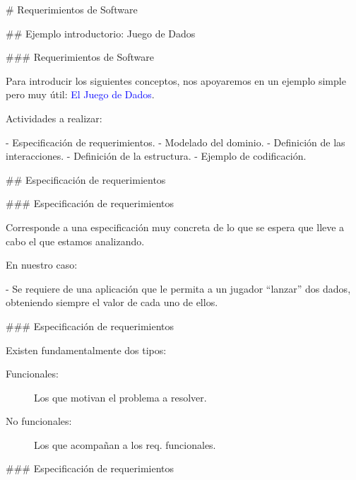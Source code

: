 # Requerimientos de Software

## Ejemplo introductorio: Juego de Dados

### Requerimientos de Software


Para introducir los siguientes conceptos, nos apoyaremos en un ejemplo simple pero muy útil:
\textcolor{blue}{El Juego de Dados}.\newline

Actividades a realizar:

- Especificación de requerimientos.
- Modelado del dominio.
- Definición de las interacciones.
- Definición de la estructura.
- Ejemplo de codificación.


## Especificación de requerimientos

### Especificación de requerimientos


Corresponde a una especificación muy concreta de lo que se espera que lleve a cabo el
 que estamos analizando.\newline

En nuestro caso:

- Se requiere de una aplicación que le permita a un jugador ``lanzar'' dos dados, obteniendo
siempre el valor de cada uno de ellos.


### Especificación de requerimientos


Existen fundamentalmente dos tipos:

\begin{rboxx}{}
\begin{description}
    \item[Funcionales:] Los que motivan el problema a resolver.
\end{description}
\end{rboxx}

\begin{rboxx}{}
\begin{description}
    \item[No funcionales:] Los que acompañan a los req. funcionales.
\end{description}
\end{rboxx}

### Especificación de requerimientos



